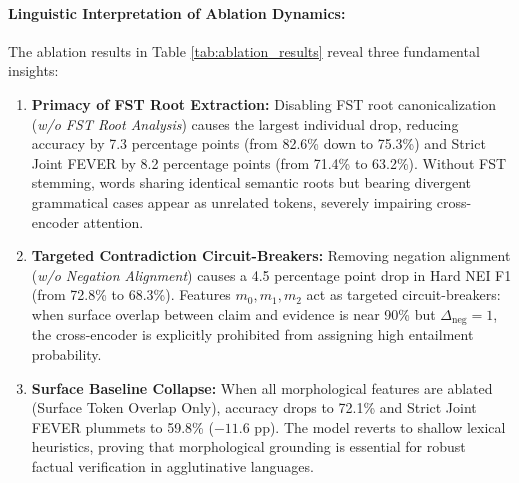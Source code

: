 \begin{table}[htbp]
\centering
\caption{Systematic morphological diagnostic feature ablation study on the Kazakh-FEVER test set ($N=141$).}
\label{tab:ablation_results}
\end{table}

\paragraph{Linguistic Interpretation of Ablation Dynamics:}
The ablation results in Table \ref{tab:ablation_results} reveal three fundamental insights:
\begin{enumerate}
    \item \textbf{Primacy of FST Root Extraction:} Disabling FST root canonicalization (\textit{w/o FST Root Analysis}) causes the largest individual drop, reducing accuracy by 7.3 percentage points (from 82.6\% down to 75.3\%) and Strict Joint FEVER by 8.2 percentage points (from 71.4\% to 63.2\%). Without FST stemming, words sharing identical semantic roots but bearing divergent grammatical cases appear as unrelated tokens, severely impairing cross-encoder attention.
    \item \textbf{Targeted Contradiction Circuit-Breakers:} Removing negation alignment (\textit{w/o Negation Alignment}) causes a 4.5 percentage point drop in Hard NEI F1 (from 72.8\% to 68.3\%). Features $m_0, m_1, m_2$ act as targeted circuit-breakers: when surface overlap between claim and evidence is near 90\% but $\Delta_{\text{neg}} = 1$, the cross-encoder is explicitly prohibited from assigning high entailment probability.
    \item \textbf{Surface Baseline Collapse:} When all morphological features are ablated (Surface Token Overlap Only), accuracy drops to 72.1\% and Strict Joint FEVER plummets to 59.8\% ($-11.6$ pp). The model reverts to shallow lexical heuristics, proving that morphological grounding is essential for robust factual verification in agglutinative languages.
\end{enumerate}

